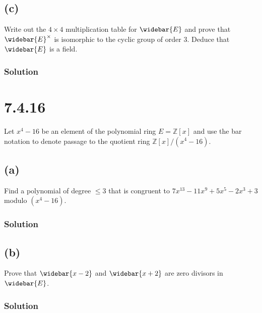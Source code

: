 \documentclass[fleqn]{article}
\begin{document}
        
        \subsection{(c)}
        Write out the $4 \times 4$ multiplication table for $\widebar{E}$ and prove that $\widebar{E}^\times$ is isomorphic to the cyclic group of order 3.  Deduce that $\widebar{E}$ is a field.
        
            \subsubsection{Solution}
            
    
    \section{7.4.16}
    Let $x^4 - 16$ be an element of the polynomial ring $E = \mathbb{Z}[x]$ and use the bar notation to denote passage to the quotient ring $\mathbb{Z}[x] / (x^4 - 16)$.
        
        \subsection{(a)}
        Find a polynomial of degree $\leq 3$ that is congruent to $7x^13 - 11x^9 + 5x^5 - 2x^3 + 3$ modulo $(x^4 - 16)$.
            
            \subsubsection{Solution}
            
        
        \subsection{(b)}
        Prove that $\widebar{x - 2}$ and $\widebar{x + 2}$ are zero divisors in $\widebar{E}$.
        
            \subsubsection{Solution}
            
    
\end{document}
